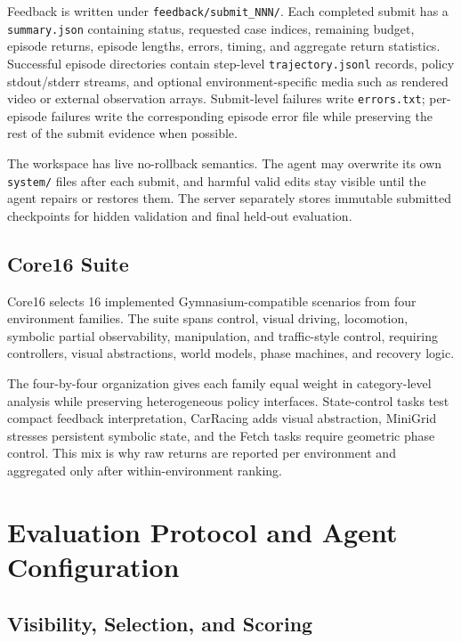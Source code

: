 Feedback is written under \texttt{feedback/submit\_NNN/}. Each completed
submit has a \texttt{summary.json} containing status, requested case indices,
remaining budget, episode returns, episode lengths, errors, timing, and
aggregate return statistics. Successful episode directories contain step-level
\texttt{trajectory.jsonl} records, policy stdout/stderr streams, and optional
environment-specific media such as rendered video or external observation
arrays. Submit-level failures write \texttt{errors.txt}; per-episode failures
write the corresponding episode error file while preserving the rest of the
submit evidence when possible.

The workspace has live no-rollback semantics. The agent may overwrite its own
\texttt{system/} files after each submit, and harmful valid edits stay visible
until the agent repairs or restores them. The server separately stores
immutable submitted checkpoints for hidden validation and final held-out
evaluation.

\subsection{Core16 Suite}
\label{app:core16-suite-details}

Core16 selects 16 implemented Gymnasium-compatible scenarios from four
environment families. The suite spans control, visual driving, locomotion,
symbolic partial observability, manipulation, and traffic-style control,
requiring controllers, visual abstractions, world models, phase machines, and
recovery logic.



The four-by-four organization gives each family equal weight in category-level
analysis while preserving heterogeneous policy interfaces. State-control tasks
test compact feedback interpretation, CarRacing adds visual abstraction,
MiniGrid stresses persistent symbolic state, and the Fetch tasks require
geometric phase control. This mix is why raw returns are reported per
environment and aggregated only after within-environment ranking.

\section{Evaluation Protocol and Agent Configuration}
\label{app:evaluation-protocol}

\subsection{Visibility, Selection, and Scoring}
\label{app:evaluation-and-scoring}
\label{sec:hidden-eval}
\label{sec:scoring-audit}

